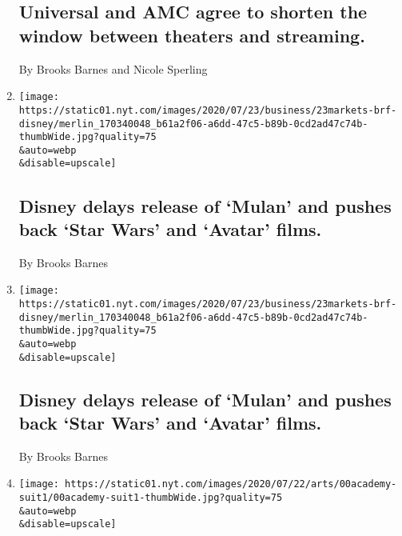 \begin{enumerate}
{  \subsection{Universal and AMC agree to shorten the window between
  theaters and
  streaming.}\label{universal-and-amc-agree-to-shorten-the-window-between-theaters-and-streaming}}

  By Brooks Barnes and Nicole Sperling
\item
  \href{/2020/07/24/business/disney-delays-release-of-mulan-and-pushes-back-star-wars-and-avatar-films.html}{}

  \texttt{[image: https://static01.nyt.com/images/2020/07/23/business/23markets-brf-disney/merlin\_170340048\_b61a2f06-a6dd-47c5-b89b-0cd2ad47c74b-thumbWide.jpg?quality=75\\\&auto=webp\\\&disable=upscale]}

  \hypertarget{disney-delays-release-of-mulan-and-pushes-back-star-wars-and-avatar-films}{%
  \subsection{Disney delays release of `Mulan' and pushes back `Star
  Wars' and `Avatar'
  films.}\label{disney-delays-release-of-mulan-and-pushes-back-star-wars-and-avatar-films}}

  By Brooks Barnes
\item
  \href{/live/2020/07/23/business/stock-market-today-coronavirus/disney-delays-release-of-mulan-and-pushes-back-star-wars-and-avatar-films}{}

  \texttt{[image: https://static01.nyt.com/images/2020/07/23/business/23markets-brf-disney/merlin\_170340048\_b61a2f06-a6dd-47c5-b89b-0cd2ad47c74b-thumbWide.jpg?quality=75\\\&auto=webp\\\&disable=upscale]}

  \hypertarget{disney-delays-release-of-mulan-and-pushes-back-star-wars-and-avatar-films-1}{%
  \subsection{Disney delays release of `Mulan' and pushes back `Star
  Wars' and `Avatar'
  films.}\label{disney-delays-release-of-mulan-and-pushes-back-star-wars-and-avatar-films-1}}

  By Brooks Barnes
\item
  \href{/2020/07/20/movies/oscars-lawsuit.html}{}

  \texttt{[image: https://static01.nyt.com/images/2020/07/22/arts/00academy-suit1/00academy-suit1-thumbWide.jpg?quality=75\\\&auto=webp\\\&disable=upscale]}


\end{enumerate}
